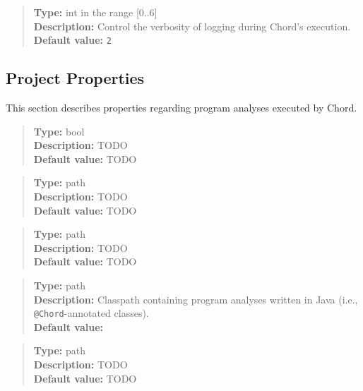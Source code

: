 \begin{quote}
{\bf Type:} int in the range [0..6]  \\
{\bf Description:} Control the verbosity of logging during Chord's execution.  \\
{\bf Default value:} {\tt 2}
\end{quote}

\subsection{Project Properties}
\label{sec:project-props}

This section describes properties regarding program analyses executed by Chord.
\\[10pt]

\begin{quote}
{\bf Type:} bool \\
{\bf Description:} TODO \\
{\bf Default value:} TODO
\end{quote}

\begin{quote}
{\bf Type:} path \\
{\bf Description:} TODO \\
{\bf Default value:} TODO
\end{quote}

\begin{quote}
{\bf Type:} path \\
{\bf Description:} TODO \\
{\bf Default value:} TODO
\end{quote}

\begin{quote}
{\bf Type:} path \\
{\bf Description:} Classpath containing program analyses written in Java (i.e., {\tt @Chord}-annotated classes).  \\
{\bf Default value:} 
\end{quote}

\begin{quote}
{\bf Type:} path \\
{\bf Description:} TODO \\
{\bf Default value:} TODO
\end{quote}

